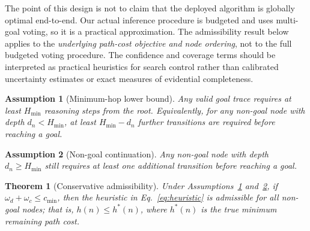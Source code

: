\documentclass[11pt]{article}
\newtheorem{theorem}{Theorem}
\newtheorem{assumption}{Assumption}
\begin{document}
The point of this design is not to claim that the deployed algorithm is globally optimal end-to-end. Our actual inference procedure is budgeted and uses multi-goal voting, so it is a practical approximation. The admissibility result below applies to the \emph{underlying path-cost objective and node ordering}, not to the full budgeted voting procedure. The confidence and coverage terms should be interpreted as practical heuristics for search control rather than calibrated uncertainty estimates or exact measures of evidential completeness.

\begin{assumption}[Minimum-hop lower bound]
\label{ass:minhop}
Any valid goal trace requires at least $H_{\min}$ reasoning steps from the root. Equivalently, for any non-goal node with depth $d_n < H_{\min}$, at least $H_{\min}-d_n$ further transitions are required before reaching a goal.
\end{assumption}

\begin{assumption}[Non-goal continuation]
\label{ass:continue}
Any non-goal node with depth $d_n \geq H_{\min}$ still requires at least one additional transition before reaching a goal.
\end{assumption}

\begin{theorem}[Conservative admissibility]
\label{thm:admissible}
Under Assumptions~\ref{ass:minhop} and~\ref{ass:continue}, if $\omega_d + \omega_c \leq c_{\min}$, then the heuristic in Eq.~\eqref{eq:heuristic} is admissible for all non-goal nodes; that is, $h(n) \leq h^*(n)$, where $h^*(n)$ is the true minimum remaining path cost.
\end{theorem}
\end{document}
